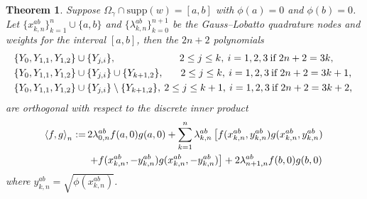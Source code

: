 \documentclass{amsart}
\newtheorem{thm}{Theorem}[section]
\theoremstyle{remark}
\def\la{{\langle}}
\def\ra{{\rangle}}
\def\g{{\gamma}}
\def\la{{\langle}}
\def\ra{{\rangle}}
\begin{document}
\begin{thm}
Suppose $\Omega_\g \cap \mathrm{supp}(w) = [a, b]$ with $\phi(a) = 0$ and $\phi(b) = 0$. Let $\lbrace x_{k,n}^{ab} \rbrace_{k=1}^{n} \cup \lbrace a,b \rbrace$ and $\lbrace \lambda_{k,n}^{ab} \rbrace_{k=0}^{n+1}$ be the Gauss--Lobatto quadrature nodes and weights for the interval $[a, b]$, then the $2n+2$ polynomials 
\begin{align}
&  \hspace{-0.1 cm} \lbrace Y_{0}, Y_{1,1}, Y_{1,2}   \rbrace \cup  \lbrace Y_{j,i}  \rbrace,\qquad \qquad \qquad \hspace{0.15 cm} 2 \leq j \leq k,\: i= 1, 2, 3\:\mathrm{ if }\: 2n + 2 = 3k, \label{eq:GLbasisc1}  \\
&  \hspace{-0.1 cm} \lbrace Y_{0}, Y_{1,1}, Y_{1,2}   \rbrace \cup  \lbrace Y_{j,i}  \rbrace  \cup \lbrace  Y_{k+1,2}    \rbrace, \hspace{0.25 cm} \quad 2 \leq j \leq k,\: i= 1, 2, 3  \:\mathrm{ if }\: 2n + 2 = 3k+1, \\
& \hspace{-0.1 cm} \lbrace Y_{0}, Y_{1,1}, Y_{1,2}   \rbrace \cup  \lbrace Y_{j,i}  \rbrace \setminus \lbrace Y_{k+1,2}  \rbrace ,\: 2 \leq j \leq k+1,\: i= 1, 2, 3 \:\mathrm{ if }\: 2n + 2 = 3k+2,  \label{eq:GLbasisc3}
\end{align} 
are orthogonal with respect to the discrete inner product
\begin{align}
 \label{eq:GLip} \la f,g \ra_n :=\, & 2\lambda_{0,n}^{ab} f(a,0)g(a,0) +   \sum_{k=1}^n \lambda_{k,n}^{ab}\left[ f(x_{k,n}^{ab},y_{k,n}^{ab})g(x_{k,n}^{ab},y_{k,n}^{ab}) \right. \\ 
& \left. + f(x_{k,n}^{ab},-y_{k,n}^{ab})g(x_{k,n}^{ab},-y_{k,n}^{ab}) \right] + 2\lambda_{n+1,n}^{ab} f(b,0)g(b,0) \notag
\end{align}
where $y_{k,n}^{ab} = \sqrt{\phi(x_{k,n}^{ab})}$.
\end{thm}
\end{document}
